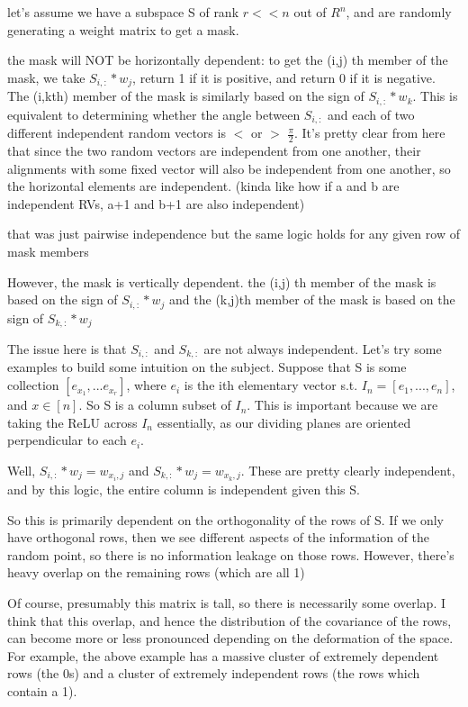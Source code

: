 \documentclass[12pt]{article}
\begin{document}
let's assume we have a subspace S of rank $ r << n$ out of $R^n$, and are randomly generating a weight matrix to get a mask.

the mask will NOT be horizontally dependent:
to get the (i,j) th member of the mask, we take $S_{i,:} * w_j$, return 1 if it is positive, and return 0 if it is negative.
The (i,kth) member of the mask is similarly based on the sign of $S_{i,:} * w_k$.
This is equivalent to determining whether the angle between $S_{i,:}$ and each of two different independent random vectors is $<$ or $>$ $\frac{\pi}{2}$. It's pretty clear from here that since the two random vectors are independent from one another, their alignments with some fixed vector will also be independent from one another, so the horizontal elements are independent.
(kinda like how if a and b are independent RVs, a+1 and b+1 are also independent)

that was just pairwise independence but the same logic holds for any given row of mask members

However, the mask is vertically dependent. 
the (i,j) th member of the mask is based on the sign of $S_{i,:} * w_j$
and the (k,j)th member of the mask is based on the sign of $S_{k,:} * w_j$

The issue here is that $S_{i,:}$ and $S_{k,:}$ are not always independent.
Let's try some examples to build some intuition on the subject.
Suppose that S is some collection $[e_{x_1},...e_{x_r}]$, where $e_i$ is the ith elementary vector s.t. $I_n = [e_1,...,e_n]$, and $x \in [n]$. So S is a column subset of $I_n$. This is important because we are taking the ReLU across $I_n$ essentially, as our dividing planes are oriented perpendicular to each $e_i$.

Well, $S_{i,:} * w_j = w_{x_i,j}$ and $S_{k,:} * w_j = w_{x_k,j}$. These are pretty clearly independent, and by this logic, the entire column is independent given this S.  

So this is primarily dependent on the orthogonality of the rows of S. If we only have orthogonal rows, then we see different aspects of the information of the random point, so there is no information leakage on those rows. However, there's heavy overlap on the remaining rows (which are all 1)

Of course, presumably this matrix is tall, so there is necessarily some overlap. I think that this overlap, and hence the distribution of the covariance of the rows, can become more or less pronounced depending on the deformation of the space. For example, the above example has a massive cluster of extremely dependent rows (the 0s) and a cluster of extremely independent rows (the rows which contain a 1).
\end{document}

